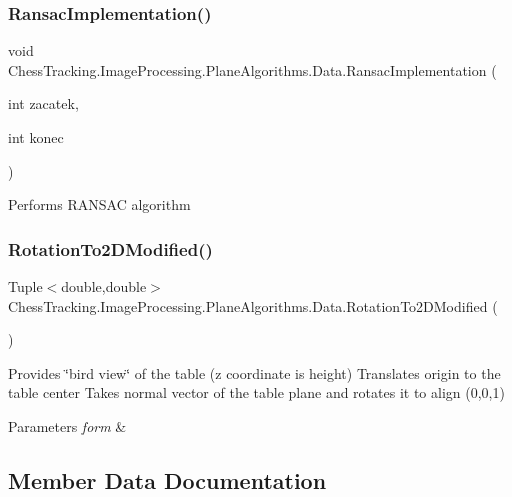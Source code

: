 \subsubsection{\texorpdfstring{RansacImplementation()}{RansacImplementation()}}
{\footnotesize\ttfamily void Chess\+Tracking.\+Image\+Processing.\+Plane\+Algorithms.\+Data.\+Ransac\+Implementation (\begin{DoxyParamCaption}\item[{int}]{zacatek,  }\item[{int}]{konec }\end{DoxyParamCaption})\hspace{0.3cm}{\ttfamily [private]}}



Performs R\+A\+N\+S\+AC algorithm 

\mbox{\label{class_chess_tracking_1_1_image_processing_1_1_plane_algorithms_1_1_data_a83ebef6478b258f001e571201a4f145a}} 
\subsubsection{\texorpdfstring{RotationTo2DModified()}{RotationTo2DModified()}}
{\footnotesize\ttfamily Tuple$<$double,double$>$ Chess\+Tracking.\+Image\+Processing.\+Plane\+Algorithms.\+Data.\+Rotation\+To2\+D\+Modified (\begin{DoxyParamCaption}{ }\end{DoxyParamCaption})}



Provides \char`\"{}bird view\char`\"{} of the table (z coordinate is height) Translates origin to the table center Takes normal vector of the table plane and rotates it to align (0,0,1) 


\begin{DoxyParams}{Parameters}
{\em form} & \\
\hline
\end{DoxyParams}


\subsection{Member Data Documentation}
\mbox{\label{class_chess_tracking_1_1_image_processing_1_1_plane_algorithms_1_1_data_aadb769b49d3275c69d22d87aa61a6e8a}} 
